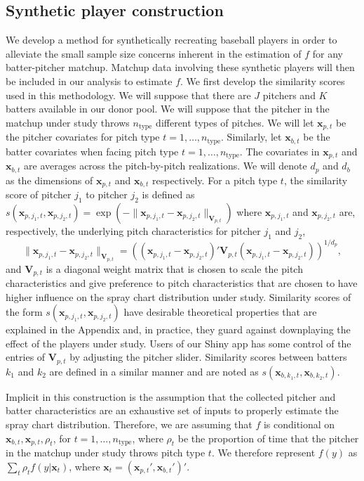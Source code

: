 \documentclass[12pt]{article}
\newcommand{\V}{\textbf{V}}
\newcommand{\x}{\textbf{x}}
\begin{document}
\subsection{Synthetic player construction}

We develop a method for synthetically recreating baseball players in order to alleviate the small sample size concerns inherent in the estimation of $f$ for any batter-pitcher matchup. Matchup data involving these synthetic players will then be included in our analysis to estimate $f$. We first develop the similarity scores used in this methodology. We will suppose that there are $J$ pitchers and $K$ batters available in our donor pool. We will suppose that the pitcher in the matchup under study throws $n_{\text{type}}$ different types of pitches. We will let $\x_{p,t}$ be the pitcher covariates for pitch type $t = 1,\ldots,n_{\text{type}}$. Similarly, let $\x_{b,t}$ be the batter covariates when facing pitch type $t = 1,\ldots,n_{\text{type}}$. The covariates in $\x_{p,t}$ and $\x_{b,t}$ are averages across the pitch-by-pitch realizations. We will denote $d_p$ and $d_b$ as the dimensions of $\x_{p,t}$ and $\x_{b,t}$ respectively. For a pitch type $t$, the similarity score of pitcher $j_1$ to pitcher $j_2$ is defined as $s(\x_{p,j_1,t}, \x_{p,j_2,t}) = \exp(-\|\x_{p,j_1,t}-\x_{p,j_2,t}\|_{\V_{p,t}})$ where $\x_{p,j_1,t}$ and $\x_{p,j_2,t}$ are, respectively, the underlying pitch characteristics for pitcher $j_1$ and $j_2$,
\begin{equation} \label{Vpt}
   \|\x_{p,j_1,t}-\x_{p,j_2,t}\|_{\V_{p,t}} 
     = \left((\x_{p,j_1,t}-\x_{p,j_2,t})'\V_{p,t}(\x_{p,j_1,t}-\x_{p,j_2,t})\right)^{1/d_p},
\end{equation}
and $\V_{p,t}$ is a diagonal weight matrix that is chosen to scale the pitch characteristics and give preference to pitch characteristics that are chosen to have higher influence on the spray chart distribution under study. Similarity scores of the form $s(\x_{p,j_1,t}, \x_{p,j_2,t})$ have desirable theoretical properties that are explained in the Appendix and, in practice, they guard against downplaying the effect of the players under study. Users of our Shiny app has some control of the entries of $\V_{p,t}$ by adjusting the pitcher slider. Similarity scores between batters $k_1$ and $k_2$ are defined in a similar manner and are noted as $s(\x_{b,k_1,t}, \x_{b,k_2,t})$.

Implicit in this construction is the assumption that the collected pitcher and batter characteristics are an exhaustive set of inputs to properly estimate the spray chart distribution. Therefore, we are assuming that $f$ is conditional on $\x_{b,t}, \x_{p,t}, \rho_t$, for $t = 1,\ldots,n_{\text{type}}$, where $\rho_t$ be the proportion of time that the pitcher in the matchup under study throws pitch type $t$. We therefore represent $f(y)$ as $\sum_t \rho_t f(y|\x_t)$, where $\x_t = (\x_{p,t}', \x_{b,t}')'$. 
\end{document}
